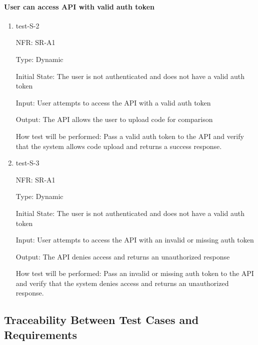 \documentclass[12pt, titlepage]{article}
\begin{document}
\paragraph{User can access API with valid auth token}
\begin{enumerate}
  \item{test-S-2}

  NFR: SR-A1

  Type: Dynamic
            
  Initial State: The user is not authenticated and does not have a valid auth token
            
  Input: User attempts to access the API with a valid auth token
            
  Output: The API allows the user to upload code for comparison
            
  How test will be performed: 
  Pass a valid auth token to the API and verify that the system allows code upload 
  and returns a success response.

  \item{test-S-3}

  NFR: SR-A1

  Type: Dynamic

  Initial State: The user is not authenticated and does not have a valid auth token

  Input: User attempts to access the API with an invalid or missing auth token

  Output: The API denies access and returns an unauthorized response

  How test will be performed:
  Pass an invalid or missing auth token to the API and verify that the system denies 
  access and returns an unauthorized response.

\end{enumerate}

\subsection{Traceability Between Test Cases and Requirements}
\end{document}
